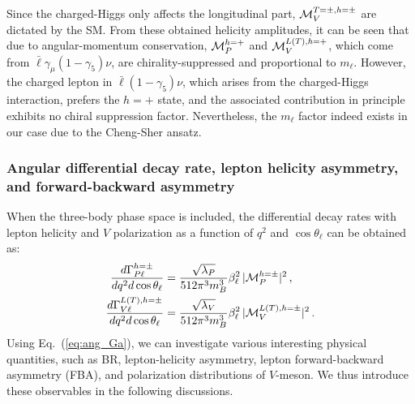 \documentclass[prd,preprint,superscriptaddress,amsmath,amssymb]{revtex4}
\begin{document}
Since the charged-Higgs only affects the longitudinal part, ${\cal M}^{T=\pm, h=\pm}_{V}$  are dictated by   the SM.  From  these obtained helicity amplitudes, it can be seen that due to angular-momentum conservation, ${\cal M}^{ h=+}_{P}$ and ${\cal M}^{L(T), h=+}_{V}$, which come from $\bar\ell \gamma_\mu (1-\gamma_5)\nu$,  are chirality-suppressed and proportional to $m_\ell$.  However, the charged lepton in $\bar\ell (1-\gamma_5) \nu$, which arises from the charged-Higgs interaction, prefers the $h=+$ state, and the associated contribution in principle exhibits no  chiral suppression factor. Nevertheless,  the $m_\ell$ factor indeed exists in our case due to the Cheng-Sher ansatz. 

 \subsubsection{ Angular differential decay rate, lepton helicity asymmetry, and forward-backward asymmetry}

When  the three-body phase space is included, the differential decay rates with  lepton helicity and $V$ polarization as a function of $q^2$ and $\cos\theta_\ell$ can be obtained as:
\begin{align}
 \frac{d\Gamma^{h=\pm}_{P\ell }}{dq^2 d\cos\theta_\ell} & = \frac{\sqrt{\lambda_{P}}}{512 \pi^3 m^3_B} \beta^2_{\ell}\,  |{\cal M}^{h=\pm }_{P}|^2   \,, \nonumber \\ 
 \frac{d\Gamma^{L(T), h=\pm}_{V\ell }}{dq^2 d\cos\theta_\ell}  & = \frac{\sqrt{\lambda_{V}}}{512 \pi^3 m^3_B} \beta^2_{\ell}\,  |{\cal M}^{L(T),h=\pm }_{V}|^2  \,. \label{eq:ang_Ga}
\end{align}
 Using Eq.~(\ref{eq:ang_Ga}), we can investigate various interesting physical quantities, such as BR, lepton-helicity asymmetry, lepton forward-backward asymmetry (FBA), and polarization distributions of $V$-meson. We thus introduce these observables in the following discussions. 
 
\end{document}
